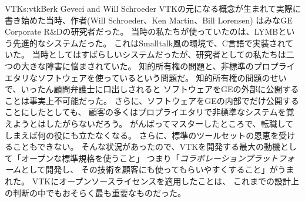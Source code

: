\begin{aosachapter}{VTK}{s:vtk}{Berk Geveci and Will Schroeder}
VTKの元になる概念が生まれて実際に書き始めた当時、作者(Will Schroeder、Ken Martin、Bill Lorensen)
はみなGE Corporate R\&Dの研究者だった。
当時の私たちが使っていたのは、LYMBという先進的なシステムだった。
これはSmalltalk風の環境で、C言語で実装されていた。
当時としてはすばらしいシステムだったが、研究者としての私たちは二つの大きな障害に悩まされていた。
知的所有権の問題と、非標準のプロプライエタリなソフトウェアを使っているという問題だ。
知的所有権の問題のせいで、いったん顧問弁護士に口出しされると
ソフトウェアをGEの外部に公開することは事実上不可能だった。
さらに、ソフトウェアをGEの内部でだけ公開することにしたとしても、
顧客の多くはプロプライエタリで非標準なシステムを覚えようとはしたがらないだろう。
がんばってマスターしたところで、転職してしまえば何の役にも立たなくなる。
さらに、標準のツールセットの恩恵を受けることもできない。
そんな状況があったので、VTKを開発する最大の動機として「オープンな標準規格を使うこと」
つまり「\emph{コラボレーションプラットフォーム}として開発し、
その技術を顧客にも使ってもらいやすくすること」がうまれた。
VTKにオープンソースライセンスを適用したことは、
これまでの設計上の判断の中でもおそらく最も重要なものだった。


\end{aosachapter}
